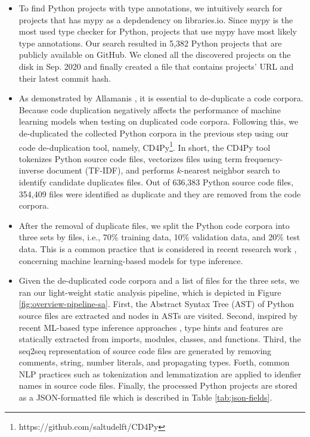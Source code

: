 \documentclass[10pt, conference]{IEEEtran}
\begin{document}
\begin{itemize}
	\item To find Python projects with type annotations, we intuitively search for projects that has mypy as a depdendency on libraries.io. Since mypy is the most used type checker for Python, projects that use mypy have most likely type annotations. Our search resulted in 5,382 Python projects that are publicly available on GitHub. We cloned all the discovered projects on the disk in Sep. 2020 and finally created a file that contains projects' URL and their latest commit hash.
	\item As demonstrated by Allamanis \cite{allamanis2019adverse}, it is essential to de-duplicate a code corpora. Because code duplication negatively affects the performance of machine learning models when testing on duplicated code corpora. Following this, we de-duplicated the collected Python corpora in the previous step using our code de-duplication tool, namely, CD4Py\footnote{https://github.com/saltudelft/CD4Py}. In short, the CD4Py tool tokenizes Python source code files, vectorizes files using term frequency-inverse document (TF-IDF), and performs $k$-nearest neighbor search to identify candidate duplicates files. Out of 636,383 Python source code files, 354,409 files were identified as duplicate and they are removed from the code corpora.
	\item After the removal of duplicate files, we split the Python code corpora into three sets by files, i.e., 70\% training data, 10\% validation data, and 20\% test data. This is a common practice that is considered in recent research work \cite{pradel2019typewriter, allamanis2020typilus}, concerning machine learning-based models for type inference.
	\item Given the de-duplicated code corpora and a list of files for the three sets, we ran our light-weight static analysis pipeline, which is depicted in Figure \ref{fig:overview-pipeline-sa}. First, the Abstract Syntax Tree (AST) of Python source files are extracted and nodes in ASTs are visited. Second, inspired by recent ML-based type inference approaches \cite{pradel2019typewriter, malik2019nl2type}, type hints and features are statically extracted from imports, modules, classes, and functions. Third, the seq2seq representation of source code files \cite{hellendoorn2018deep} are generated by removing comments, string, number literals, and propagating types. Forth, common NLP practices such as tokenization and lemmatization are applied to idenfier names in source code files. Finally, the processed Python projects are stored as a JSON-formatted file which is described in Table \ref{tab:json-fields}. 
\end{itemize}
\end{document}
